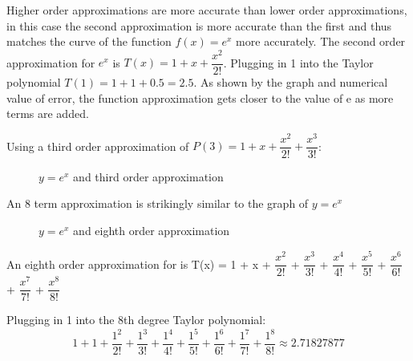 \documentclass[12pt, titlepage]{article}
\begin{document}
Higher order approximations are more accurate than lower order approximations, in this case the second approximation is more accurate than the first and thus matches the curve of the function \(f(x) = e^{x}\) more accurately. The second order approximation for \(e^{x}\) is \(T(x) = 1 + x + \dfrac{x^2}{2!}\). Plugging in 1 into the Taylor polynomial \(T(1) = 1 + 1 + 0.5 = 2.5\). As shown by the graph and numerical value of error, the function approximation gets closer to the value of e as more terms are added.

Using a third order approximation of \(P(3) = 1 + x + \dfrac{x^{2}}{2!} + \dfrac{x^{3}}{3!}\):
\begin{figure}[H]
\centering
    \caption[]{\(y=e^x\) and third order approximation}
\end{figure}

An 8 term approximation is strikingly similar to the graph of \(y = e^{x}\)
\begin{figure}[H]
\centering
    \caption[]{\(y=e^x\) and eighth order approximation}
\end{figure}

An eighth order approximation for is T(x) = 1 + x + \(\dfrac{x^2}{2!}\) + \(\dfrac{x^3}{3!}\)
+ \(\dfrac{x^4}{4!}\) + \(\dfrac{x^5}{5!}\) + \(\dfrac{x^6}{6!}\) + \(\dfrac{x^7}{7!}\) + \(\dfrac{x^8}{8!}\)

Plugging in 1 into the 8th degree Taylor polynomial:
\begin{equation*}
  1 + 1 + \dfrac{1^2}{2!} + \dfrac{1^3}{3!} + \dfrac{1^4}{4!} + \dfrac{1^5}{5!} + \dfrac{1^6}{6!} + \dfrac{1^7}{7!} + \dfrac{1^8}{8!} \approx 2.71827877
\end{equation*}
\end{document}
